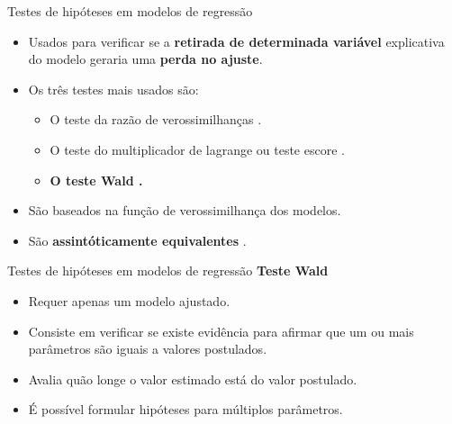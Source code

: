 \documentclass[
  ignorenonframetext,
  serif,
  professionalfont,
  usenames,
  dvipsnames,
  aspectratio = 169]{beamer}
\begin{document}
\begin{frame}{Testes de hipóteses em modelos de regressão}
\protect\hypertarget{testes-de-hipuxf3teses-em-modelos-de-regressuxe3o}{}
\begin{itemize}
    \itemsep 2ex
  
  \item Usados para verificar se a \textbf{retirada de determinada variável} explicativa do modelo geraria uma \textbf{perda no ajuste}.
  
  \item Os três testes mais usados são:

    \begin{itemize}
      \item O teste da razão de verossimilhanças \citep{trv}.
      \item O teste do multiplicador de lagrange ou teste escore \citep{score1,score2,score3}.
      \item \textbf{O teste Wald \citep{wald}.}
    \end{itemize}
  
  \item São baseados na função de verossimilhança dos modelos.
  
  \item São \textbf{assintóticamente equivalentes} \citep{engle}.
  
  \end{itemize}
\end{frame}

\begin{frame}{Testes de hipóteses em modelos de regressão}
\protect\hypertarget{testes-de-hipuxf3teses-em-modelos-de-regressuxe3o-1}{}
\textbf{Teste Wald}

\begin{itemize}

  \itemsep 2ex
  
  \item Requer apenas um modelo ajustado. 

  \item Consiste em verificar se existe evidência para afirmar que um ou mais parâmetros são iguais a valores postulados. 

  \item Avalia quão longe o valor estimado está do valor postulado. 

  \item É possível formular hipóteses para múltiplos parâmetros.

\end{itemize}
\end{frame}
\end{document}
